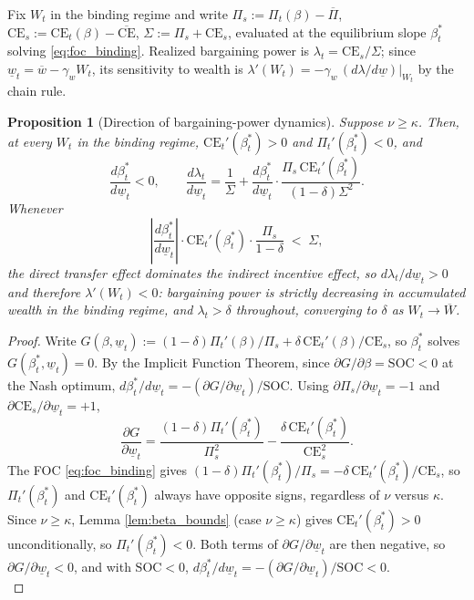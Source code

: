 \documentclass{article}
\newtheorem{proposition}{Proposition}[section]
\theoremstyle{definition}
\theoremstyle{plain}
\begin{document}
\begin{appendices}
Fix $W_t$ in the binding regime and write $\Pi_s:=\Pi_t(\beta)-\overline\Pi$, $\text{CE}_s:=\text{CE}_t(\beta)-\overline{\text{CE}}$, $\Sigma:=\Pi_s+\text{CE}_s$, evaluated at the equilibrium slope $\beta_t^*$ solving \eqref{eq:foc_binding}. Realized bargaining power is $\lambda_t=\text{CE}_s/\Sigma$; since $\underline w_t=\overline w-\gamma_w W_t$, its sensitivity to wealth is $\lambda'(W_t)=-\gamma_w\,(d\lambda/d\underline w)|_{W_t}$ by the chain rule.\\
\begin{proposition}[Direction of bargaining-power dynamics]\label{prop:lambda_dynamics}
Suppose $\nu\ge\kappa$. Then, at every $W_t$ in the binding regime, $\text{CE}_t'(\beta_t^*)>0$ and $\Pi_t'(\beta_t^*)<0$, and
\[
\frac{d\beta_t^*}{d\underline w_t} < 0, \qquad \frac{d\lambda_t}{d\underline w_t} = \frac{1}{\Sigma} + \frac{d\beta_t^*}{d\underline w_t}\cdot\frac{\Pi_s\,\text{CE}_t'(\beta_t^*)}{(1-\delta)\Sigma^2}.
\]
Whenever
\begin{equation}\label{eq:lambda_sign_condition}
\left|\frac{d\beta_t^*}{d\underline w_t}\right|\cdot \text{CE}_t'(\beta_t^*)\cdot\frac{\Pi_s}{1-\delta} \;<\; \Sigma,
\end{equation}
the direct transfer effect dominates the indirect incentive effect, so $d\lambda_t/d\underline w_t>0$ and therefore $\lambda'(W_t)<0$: bargaining power is strictly decreasing in accumulated wealth in the binding regime, and $\lambda_t>\delta$ throughout, converging to $\delta$ as $W_t\to\overline W$.
\end{proposition}
\begin{proof}
Write $G(\beta,\underline w_t):=(1-\delta)\Pi_t'(\beta)/\Pi_s+\delta\,\text{CE}_t'(\beta)/\text{CE}_s$, so $\beta_t^*$ solves $G(\beta_t^*,\underline w_t)=0$. By the Implicit Function Theorem, since $\partial G/\partial\beta=\mathrm{SOC}<0$ at the Nash optimum, $d\beta_t^*/d\underline w_t=-(\partial G/\partial\underline w_t)/\mathrm{SOC}$. Using $\partial\Pi_s/\partial\underline w_t=-1$ and $\partial\text{CE}_s/\partial\underline w_t=+1$,
\[
\frac{\partial G}{\partial\underline w_t}=\frac{(1-\delta)\Pi_t'(\beta_t^*)}{\Pi_s^2}-\frac{\delta\,\text{CE}_t'(\beta_t^*)}{\text{CE}_s^2}.
\]
The FOC \eqref{eq:foc_binding} gives $(1-\delta)\Pi_t'(\beta_t^*)/\Pi_s=-\delta\,\text{CE}_t'(\beta_t^*)/\text{CE}_s$, so $\Pi_t'(\beta_t^*)$ and $\text{CE}_t'(\beta_t^*)$ always have opposite signs, regardless of $\nu$ versus $\kappa$. Since $\nu\ge\kappa$, Lemma \ref{lem:beta_bounds} (case $\nu\ge\kappa$) gives $\text{CE}_t'(\beta_t^*)>0$ unconditionally, so $\Pi_t'(\beta_t^*)<0$. Both terms of $\partial G/\partial\underline w_t$ are then negative, so $\partial G/\partial\underline w_t<0$, and with $\mathrm{SOC}<0$, $d\beta_t^*/d\underline w_t=-(\partial G/\partial\underline w_t)/\mathrm{SOC}<0$.\\

\end{proof}
\end{appendices}
\end{document}
